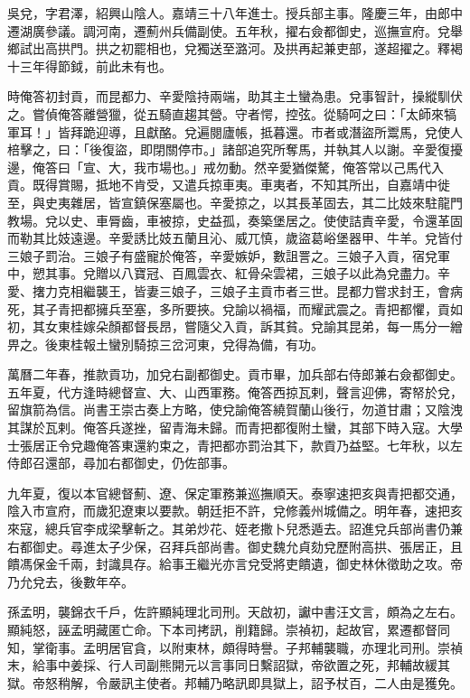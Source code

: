 \begin{pinyinscope}
吳兌，字君澤，紹興山陰人。嘉靖三十八年進士。授兵部主事。隆慶三年，由郎中遷湖廣參議。調河南，遷薊州兵備副使。五年秋，擢右僉都御史，巡撫宣府。兌舉鄉試出高拱門。拱之初罷相也，兌獨送至潞河。及拱再起兼吏部，遂超擢之。釋褐十三年得節鉞，前此未有也。

時俺答初封貢，而昆都力、辛愛陰持兩端，助其主土蠻為患。兌事智計，操縱馴伏之。嘗偵俺答離營獵，從五騎直趨其營。守者愕，控弦。從騎呵之曰：「太師來犒軍耳！」皆拜跪迎導，且獻酪。兌遍閱廬帳，抵暮還。市者或潛盜所鬻馬，兌使人棓擊之，曰：「後復盜，即閉關停市。」諸部追究所奪馬，并執其人以謝。辛愛復擾邊，俺答曰「宣、大，我市場也。」戒勿動。然辛愛猶傑驁，俺答常以己馬代入貢。既得賞賜，抵地不肯受，又遣兵掠車夷。車夷者，不知其所出，自嘉靖中徙至，與史夷雜居，皆宣鎮保塞屬也。辛愛掠之，以其長革固去，其二比妓來駐龍門教場。兌以史、車脣齒，車被掠，史益孤，奏築堡居之。使使詰責辛愛，令還革固而勒其比妓遠邊。辛愛誘比妓五蘭且沁、威兀慎，歲盜葛峪堡器甲、牛羊。兌皆付三娘子罰治。三娘子有盛寵於俺答，辛愛嫉妒，數詛詈之。三娘子入貢，宿兌軍中，愬其事。兌贈以八寶冠、百鳳雲衣、紅骨朵雲裙，三娘子以此為兌盡力。辛愛、撦力克相繼襲王，皆妻三娘子，三娘子主貢市者三世。昆都力嘗求封王，會病死，其子青把都擁兵至塞，多所要挾。兌諭以禍福，而耀武震之。青把都懼，貢如初，其女東桂嫁朵顏都督長昂，嘗隨父入貢，訴其貧。兌諭其昆弟，每一馬分一繒畀之。後東桂報土蠻別騎掠三岔河東，兌得為備，有功。

萬曆二年春，推款貢功，加兌右副都御史。貢市畢，加兵部右侍郎兼右僉都御史。五年夏，代方逢時總督宣、大、山西軍務。俺答西掠瓦剌，聲言迎佛，寄帑於兌，留旗箭為信。尚書王崇古奏上方略，使兌諭俺答繞賀蘭山後行，勿道甘肅；又陰洩其謀於瓦剌。俺答兵遂挫，留青海未歸。而青把都復附土蠻，其部下時入寇。大學士張居正令兌趣俺答東還約束之，青把都亦罰治其下，款貢乃益堅。七年秋，以左侍郎召還部，尋加右都御史，仍佐部事。

九年夏，復以本官總督薊、遼、保定軍務兼巡撫順天。泰寧速把亥與青把都交通，陰入市宣府，而歲犯遼東以要款。朝廷拒不許，兌修義州城備之。明年春，速把亥來寇，總兵官李成梁擊斬之。其弟炒花、姪老撒卜兒悉遁去。詔進兌兵部尚書仍兼右都御史。尋進太子少保，召拜兵部尚書。御史魏允貞劾兌歷附高拱、張居正，且饋馮保金千兩，封識具存。給事王繼光亦言兌受將吏饋遺，御史林休徵助之攻。帝乃允兌去，後數年卒。

孫孟明，襲錦衣千戶，佐許顯純理北司刑。天啟初，讞中書汪文言，頗為之左右。顯純怒，誣孟明藏匿亡命。下本司拷訊，削籍歸。崇禎初，起故官，累遷都督同知，掌衛事。孟明居官貪，以附東林，頗得時譽。子邦輔襲職，亦理北司刑。崇禎末，給事中姜採、行人司副熊開元以言事同日繫詔獄，帝欲置之死，邦輔故緩其獄。帝怒稍解，令嚴訊主使者。邦輔乃略訊即具獄上，詔予杖百，二人由是獲免。


\end{pinyinscope}
